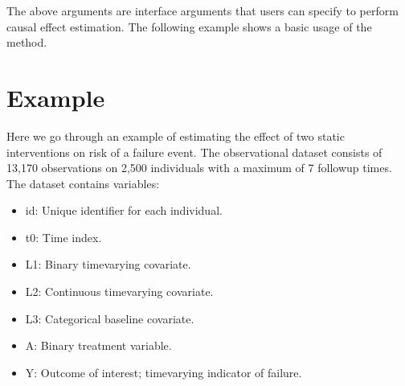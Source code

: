 \documentclass[letterpaper,10pt,english]{sphinxmanual}
\begin{document}
\sphinxAtStartPar
The above arguments are interface arguments that users can specify to perform causal effect estimation.
The following example shows a basic usage of the method.


\section{Example}
\label{\detokenize{Get Started:example}}
\sphinxAtStartPar
Here we go through an example of estimating the effect of two static interventions on risk of a failure event.
The observational dataset
 consists of 13,170 observations on 2,500 individuals with a maximum of 7 follow\sphinxhyphen{}up
times. The dataset contains variables:
\begin{itemize}
\item {} 
\sphinxAtStartPar
id: Unique identifier for each individual.

\item {} 
\sphinxAtStartPar
t0: Time index.

\item {} 
\sphinxAtStartPar
L1: Binary time\sphinxhyphen{}varying covariate.

\item {} 
\sphinxAtStartPar
L2: Continuous time\sphinxhyphen{}varying covariate.

\item {} 
\sphinxAtStartPar
L3: Categorical baseline covariate.

\item {} 
\sphinxAtStartPar
A: Binary treatment variable.

\item {} 
\sphinxAtStartPar
Y: Outcome of interest; time\sphinxhyphen{}varying indicator of failure.

\end{itemize}
\end{document}
